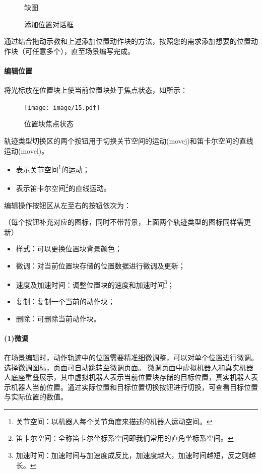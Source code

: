 \begin{figure}[ht]
	\centering
	\color{red}缺图
	\caption{添加位置对话框}
	\label{fig:添加位置对话框}
\end{figure}

通过结合拖动示教和上述添加位置动作块的方法，按照您的需求添加想要的位置动作块（可任意多个），直至场景编写完成。

\paragraph{编辑位置}
\label{sec:编辑位置}
将光标放在位置块上使当前位置块处于焦点状态，如所示：

\begin{figure}[ht]
	\centering
	\texttt{[image: image/15.pdf]}
	\caption{位置块焦点状态}
	\label{fig:位置块焦点状态}
\end{figure}

轨迹类型切换区的两个按钮用于切换关节空间的运动(movej)和笛卡尔空间的直线运动(movel)。
\begin{itemize}
	\item[\icn{image/42.pdf}] 表示关节空间\footnote{关节空间：以机器人每个关节角度来描述的机器人运动空间。}的运动；
	\item[\icn{image/42.pdf}] 表示笛卡尔空间\footnote{笛卡尔空间：全称笛卡尔坐标系空间即我们常用的直角坐标系空间。}的直线运动。
\end{itemize}

编辑操作按钮区从左至右的按钮依次为：

{\color{red}（每个按钮补充对应的图标，同时不带背景，上面两个轨迹类型的图标同样需更新）}

\begin{itemize}
\item 样式：可以更换位置块背景颜色；
\item 微调：对当前位置块存储的位置数据进行微调及更新；
\item 速度及加速时间：调整位置块的速度和加速时间\footnote{加速时间：加速时间与加速度成反比，加速度越大，加速时间越短，反之则越长。}；
\item 复制：复制一个当前的动作块；
\item 删除：可删除当前动作块。
\end{itemize}

\paragraph{(1)\quad 微调}
\label{sec:微调}
在场景编辑时，动作轨迹中的位置需要精准细微调整，可以对单个位置进行微调。选择微调图标，页面可自动跳转至微调页面。
微调页面中虚拟机器人和真实机器人底座重叠展示，其中虚拟机器人表示当前位置块存储的目标位置，真实机器人表示机器人当前位置。通过实际位置和目标位置切换按钮{\color{red}{缺图}}进行切换，可查看目标位置与实际位置的数值。

